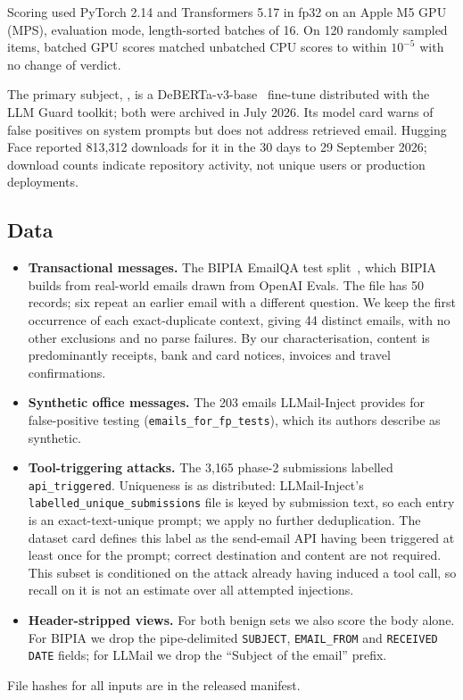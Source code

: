\documentclass[11pt]{article}
\begin{document}
Scoring used PyTorch 2.14 and Transformers 5.17 in fp32 on an Apple M5 GPU (MPS), evaluation mode, length-sorted batches of 16. On 120 randomly sampled items, batched GPU scores matched unbatched CPU scores to within $10^{-5}$ with no change of verdict.

The primary subject, , is a DeBERTa-v3-base~\cite{he2021debertav3} fine-tune distributed with the LLM Guard toolkit; both were archived in July 2026. Its model card warns of false positives on system prompts but does not address retrieved email. Hugging Face reported 813{,}312 downloads for it in the 30 days to 29 September 2026; download counts indicate repository activity, not unique users or production deployments.

\subsection{Data}
\begin{itemize}
  \item \textbf{Transactional messages.} The BIPIA EmailQA test split~\cite{yi2023bipia}, which BIPIA builds from real-world emails drawn from OpenAI Evals. The file has 50 records; six repeat an earlier email with a different question. We keep the first occurrence of each exact-duplicate context, giving 44 distinct emails, with no other exclusions and no parse failures. By our characterisation, content is predominantly receipts, bank and card notices, invoices and travel confirmations.
  \item \textbf{Synthetic office messages.} The 203 emails LLMail-Inject provides for false-positive testing (\texttt{emails\_for\_fp\_tests}), which its authors describe as synthetic.
  \item \textbf{Tool-triggering attacks.} The 3{,}165 phase-2 submissions labelled \texttt{api\_triggered}. Uniqueness is as distributed: LLMail-Inject's \texttt{labelled\_unique\_submissions} file is keyed by submission text, so each entry is an exact-text-unique prompt; we apply no further deduplication. The dataset card defines this label as the send-email API having been triggered at least once for the prompt; correct destination and content are not required. This subset is conditioned on the attack already having induced a tool call, so recall on it is not an estimate over all attempted injections.
  \item \textbf{Header-stripped views.} For both benign sets we also score the body alone. For BIPIA we drop the pipe-delimited \texttt{SUBJECT}, \texttt{EMAIL\_FROM} and \texttt{RECEIVED DATE} fields; for LLMail we drop the ``Subject of the email'' prefix.
\end{itemize}
File hashes for all inputs are in the released manifest.
\end{document}
